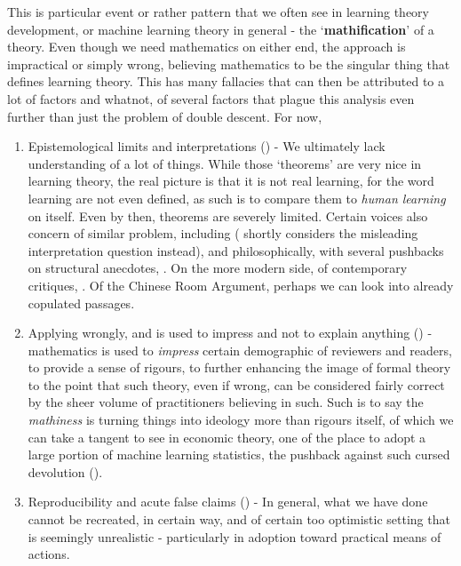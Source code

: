 This is particular event or rather pattern that we often see in learning theory development, or machine learning theory in general - the `\textbf{mathification}' of a theory. Even though we need mathematics on either end, the approach is impractical or simply wrong, believing mathematics to be the singular thing that defines learning theory. This has many fallacies that can then be attributed to a lot of factors and whatnot, of several factors that plague this analysis even further than just the problem of double descent. For now, 
\begin{enumerate}[itemsep=2pt,topsep=1pt]
    \item Epistemological limits and interpretations (\cite{electronics13020416}) - We ultimately lack understanding of a lot of things. While those `theorems' are very nice in learning theory, the real picture is that it is not real learning, for the word learning are not even defined, as such is to compare them to \textit{human learning} on itself. Even by then, theorems are severely limited. Certain voices also concern of similar problem, including \cite{lipton2017mythosmodelinterpretability,doshi2017towards,molnar2020general} (\cite{molnar2020general} shortly considers the misleading interpretation question instead), and philosophically, with several pushbacks on structural anecdotes, \cite{dreyfus1965alchemy,dreyfus1972what,dreyfus1986mind,suchman1987plans,brooks1991intelligence,searle1980minds,mccarthy1969philosophical,harnad1990symbol}. On the more modern side, of contemporary critiques, \cite{pearl2009causality,marcus2018deep,sutton2019bitter}. Of the Chinese Room Argument, perhaps we can look into already copulated passages. 
    \item Applying wrongly, and is used to impress and not to explain anything (\cite{lipton2018troublingtrendsmachinelearning}) - mathematics is used to \textit{impress} certain demographic of reviewers and readers, to provide a sense of rigours, to further enhancing the image of formal theory to the point that such theory, even if wrong, can be considered fairly correct by the sheer volume of practitioners believing in such. Such is to say the \textit{mathiness} is turning things into ideology more than rigours itself, of which we can take a tangent to see in economic theory, one of the place to adopt a large portion of machine learning statistics, the pushback against such cursed devolution (\cite{romer2015mathiness,syll2024postreal}). 
    \item Reproducibility and acute false claims (\cite{kapoor2022leakage}) - In general, what we have done cannot be recreated, in certain way, and of certain too optimistic setting that is seemingly unrealistic - particularly in adoption toward practical means of actions. 
\end{enumerate}
